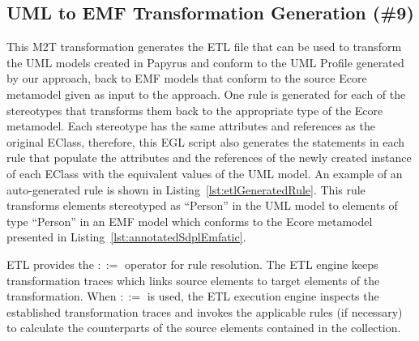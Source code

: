\subsection{UML to EMF Transformation Generation (\#9)}
\label{sec:uml2emf}
This M2T transformation generates the ETL file that can be used to transform the UML models created in Papyrus and conform to the UML Profile generated by our approach, back to EMF models that conform to the source Ecore metamodel given as input to the approach. 
One rule is generated for each of the stereotypes that transforms them back to the appropriate type of the Ecore metamodel. 
Each stereotype has the same attributes and references as the original EClass, therefore, this EGL script also generates the statements in each rule that populate the attributes and the references of the newly created instance of each EClass with the equivalent values of the UML model. 
An example of an auto-generated rule is shown in Listing~\ref{lst:etlGeneratedRule}. 
This rule transforms elements stereotyped as ``Person'' in the UML model to elements of type ``Person'' in an EMF model which conforms to the Ecore metamodel presented in Listing~\ref{lst:annotatedSdplEmfatic}.




ETL provides the $::=$ operator for rule resolution. 
The ETL engine keeps transformation traces which links source elements to target elements of the transformation. 
When $::=$ is used, the ETL execution engine inspects the established transformation traces and invokes the applicable rules (if necessary) to calculate the counterparts of the source elements contained in the collection. 


